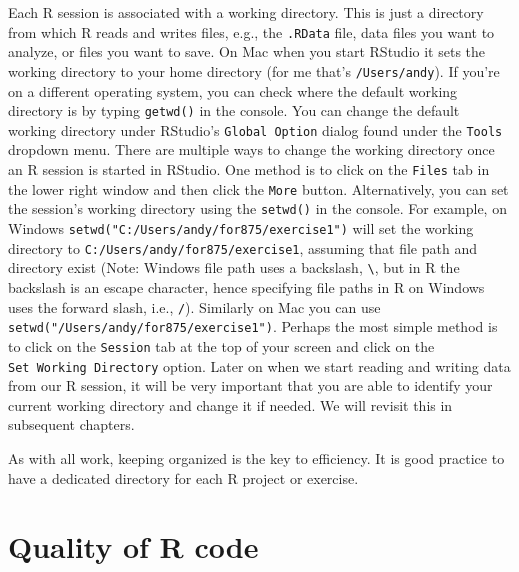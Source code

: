 \documentclass[]{krantz}
\begin{document}
Each R session is associated with a working directory. This is just a
directory from which R reads and writes files, e.g., the \texttt{.RData}
file, data files you want to analyze, or files you want to save. On Mac
when you start RStudio it sets the working directory to your home
directory (for me that's \texttt{/Users/andy}). If you're on a different
operating system, you can check where the default working directory is
by typing \texttt{getwd()} in the console. You can change the default
working directory under RStudio's \verb+Global Option+ dialog found
under the \texttt{Tools} dropdown menu. There are multiple ways to
change the working directory once an R session is started in RStudio.
One method is to click on the \texttt{Files} tab in the lower right
window and then click the \texttt{More} button. Alternatively, you can
set the session's working directory using the \texttt{setwd()} in the
console. For example, on Windows
\texttt{setwd("C:/Users/andy/for875/exercise1")} will set the working
directory to \texttt{C:/Users/andy/for875/exercise1}, assuming that file
path and directory exist (Note: Windows file path uses a backslash,
\texttt{\textbackslash{}}, but in R the backslash is an escape
character, hence specifying file paths in R on Windows uses the forward
slash, i.e., \texttt{/}). Similarly on Mac you can use
\texttt{setwd("/Users/andy/for875/exercise1")}. Perhaps the most simple
method is to click on the \texttt{Session} tab at the top of your screen
and click on the \texttt{Set\ Working\ Directory} option. Later on when
we start reading and writing data from our R session, it will be very
important that you are able to identify your current working directory
and change it if needed. We will revisit this in subsequent chapters.

As with all work, keeping organized is the key to efficiency. It is good
practice to have a dedicated directory for each R project or exercise.

\section{Quality of R code}\label{quality-of-r-code}
\end{document}
